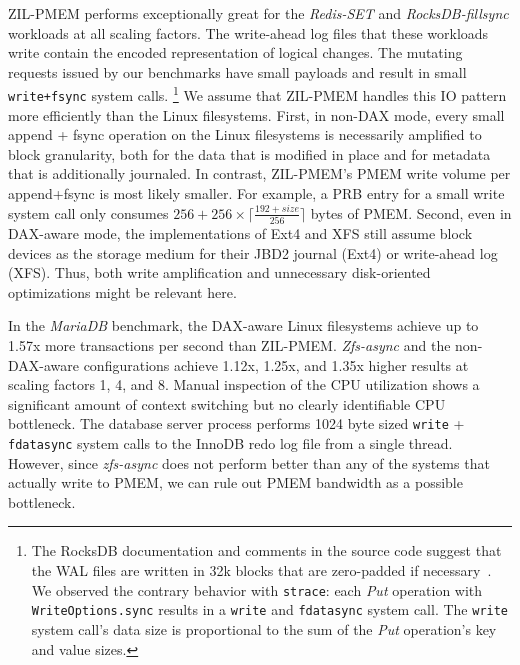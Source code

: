 \documentclass[12pt,a4paper,twoside]{book}
\begin{document}
{ZIL-PMEM performs exceptionally great for the \textit{Redis-SET} and \textit{RocksDB-fillsync} workloads at all scaling factors.
The write-ahead log files that these workloads write contain the encoded representation of logical changes.
The mutating requests issued by our benchmarks have small payloads and result in small \lstinline{write+fsync} system calls.%
\footnote{
    The RocksDB documentation and comments in the source code suggest that the WAL files are written in 32k blocks that are zero-padded if necessary~\cite[db/log\_writer.h]{RocksDBGitHubWikiWalPerformance}.
    We observed the contrary behavior with \lstinline{strace}: each \textit{Put} operation with \lstinline{WriteOptions.sync} results in a \lstinline{write} and \lstinline{fdatasync} system call. The \lstinline{write} system call's data size is proportional to the sum of the \textit{Put} operation's key and value sizes.
}
We assume that ZIL-PMEM handles this IO pattern more efficiently than the Linux filesystems.
First, in non-DAX mode, every small append + fsync operation on the Linux filesystems is necessarily amplified to block granularity, both for the data that is modified in place and for metadata that is additionally journaled.
In contrast, ZIL-PMEM's PMEM write volume per append+fsync is most likely smaller.
For example, a PRB entry for a small write system call only consumes $256 + 256 \times \lceil \frac{192 + size}{256} \rceil$ bytes of PMEM.
Second, even in DAX-aware mode, the implementations of Ext4 and XFS still assume block devices as the storage medium for their JBD2 journal (Ext4) or write-ahead log (XFS).
Thus, both write amplification and unnecessary disk-oriented optimizations might be relevant here.

In the \textit{MariaDB} benchmark, the DAX-aware Linux filesystems achieve up to 1.57x more transactions per second than ZIL-PMEM.
\textit{Zfs-async} and the non-DAX-aware configurations achieve 1.12x, 1.25x, and 1.35x higher results at scaling factors 1, 4, and 8.
Manual inspection of the CPU utilization shows a significant amount of context switching but no clearly identifiable CPU bottleneck.
The database server process performs 1024 byte sized \lstinline{write} + \lstinline{fdatasync} system calls to the InnoDB redo log file from a single thread.
However, since \textit{zfs-async} does not perform better than any of the systems that actually write to PMEM, we can rule out PMEM bandwidth as a possible bottleneck.

}
\end{document}

